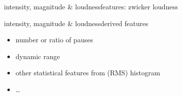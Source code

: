 \begin{frame}{intensity, magnitude \& loudness}{features: zwicker loudness}
{\begin{itemize}
            \end{itemize}
            }
        \end{frame}

        \begin{frame}{intensity, magnitude \& loudness}{derived features}
            \begin{itemize}
                \item   number or ratio of pauses
                \item   dynamic range
                \item   other statistical features from (RMS) histogram
                \item   \ldots
            \end{itemize}
        \end{frame}
        
